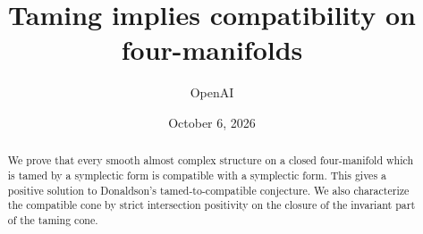 \documentclass[11pt]{article}
\title{Taming implies compatibility on four-manifolds}
\author{OpenAI}
\date{October 6, 2026}
\begin{document}
\maketitle
\begin{abstract}
We prove that every smooth almost complex structure on a closed four-manifold
which is tamed by a symplectic form is compatible with a symplectic form.
This gives a positive solution to Donaldson's tamed-to-compatible conjecture.
We also characterize the compatible cone by strict intersection positivity
on the closure of the invariant part of the taming cone.
\end{abstract}








\begingroup
\small


\endgroup
\end{document}
